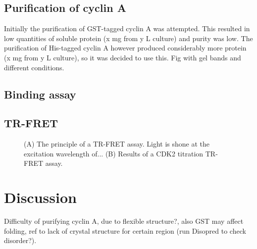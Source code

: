\subsection{Purification of cyclin A}

Initially the purification of GST-tagged cyclin A was attempted.
This resulted in low quantities of soluble protein (x mg from y L culture) and purity was low.
The purification of His-tagged cyclin A however produced considerably more protein (x mg from y L culture), so it was decided to use this.
Fig with gel bands and different conditions.


\subsection{Binding assay}

\begin{figure}
\centering


\caption{}

\label{fig:binding_assay}
\end{figure}


\subsection{TR-FRET}

\begin{figure}
\centering


\caption{(A) The principle of a TR-FRET assay.
Light is shone at the excitation wavelength of...
(B) Results of a CDK2 titration TR-FRET assay.}

\label{fig:tr_fret}
\end{figure}


\section{Discussion}

Difficulty of purifying cyclin A, due to flexible structure?, also GST may affect folding, ref to lack of crystal structure for certain region (run Disopred to check disorder?).
